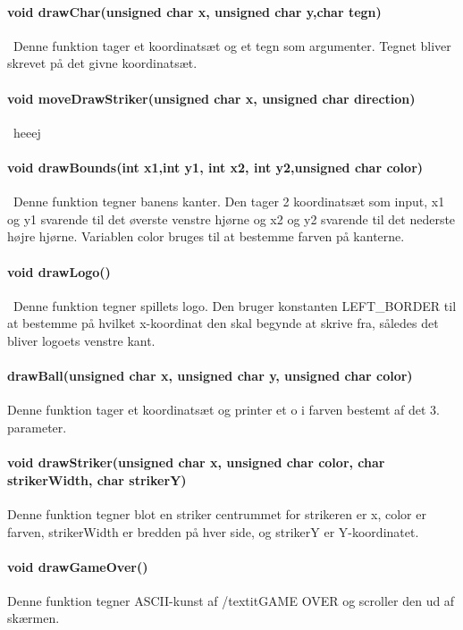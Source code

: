 \paragraph{void drawChar(unsigned char x, unsigned char y,char tegn)}\
Denne funktion tager et koordinatsæt og et tegn som argumenter. Tegnet bliver skrevet på det givne koordinatsæt.

\paragraph{void moveDrawStriker(unsigned char x, unsigned char direction)}\
heeej

\paragraph{void drawBounds(int x1,int y1, int x2, int y2,unsigned char color)}\
Denne funktion tegner banens kanter. Den tager 2 koordinatsæt som input, x1 og y1 svarende til det øverste venstre hjørne og  x2 og y2 svarende til det nederste højre hjørne. Variablen color bruges til at bestemme farven på kanterne. 

\paragraph{void drawLogo()}\
Denne funktion tegner spillets logo. Den bruger konstanten LEFT\_BORDER til at bestemme på hvilket x-koordinat den skal begynde at skrive fra, således det bliver logoets venstre kant.
\paragraph{drawBall(unsigned char x, unsigned char y, unsigned char color)}
Denne funktion tager et koordinatsæt og printer et o i farven bestemt af det 3. parameter.

\paragraph{void drawStriker(unsigned char x, unsigned char color, char strikerWidth, char strikerY)}
Denne funktion tegner blot en striker centrummet for strikeren er x, color er farven, strikerWidth er bredden på hver side, og strikerY er Y-koordinatet.

\paragraph{void drawGameOver()}
Denne funktion tegner ASCII-kunst af /textit{GAME OVER} og scroller den ud af skærmen.


